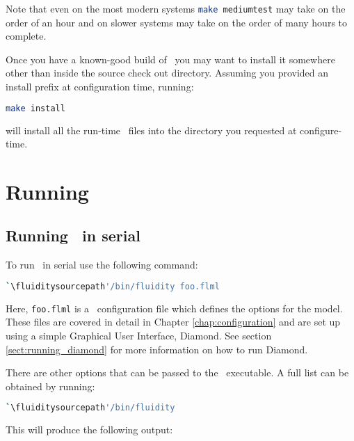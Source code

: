 Note that even on the most modern systems
\lstinline[language=Bash]+make mediumtest+ may take on the order of an hour and
on slower systems may take on the order of many hours to complete.

Once you have a known-good build of \fluidity\ you may want to install it
somewhere other than inside the source check out directory. Assuming you
provided an install prefix at configuration time, running:

\begin{lstlisting}[language=Bash]
make install
\end{lstlisting}

will install all the run-time \fluidity\ files into the directory you requested
at configure-time.

\section{Running \fluidity}
\label{sect:running_fluidity}


\subsection{Running \fluidity\ in serial}
\label{sect:running_fluidity_in_serial}

To run \fluidity\ in serial use the following command:

\begin{lstlisting}[language=bash]
`\fluiditysourcepath'/bin/fluidity foo.flml
\end{lstlisting}

Here, \lstinline[language=Bash]+foo.flml+ is a \fluidity\ configuration file
which defines the options for the model. These files are covered in detail in 
Chapter \ref{chap:configuration} and are set up using a simple Graphical User
Interface, Diamond. See section \ref{sect:running_diamond} for more information 
on how to run Diamond.

There are other options that can be passed to the \fluidity\ executable. A full list
can be obtained by running:

\begin{lstlisting}[language=bash]
`\fluiditysourcepath'/bin/fluidity
\end{lstlisting}

This will produce the following output:

